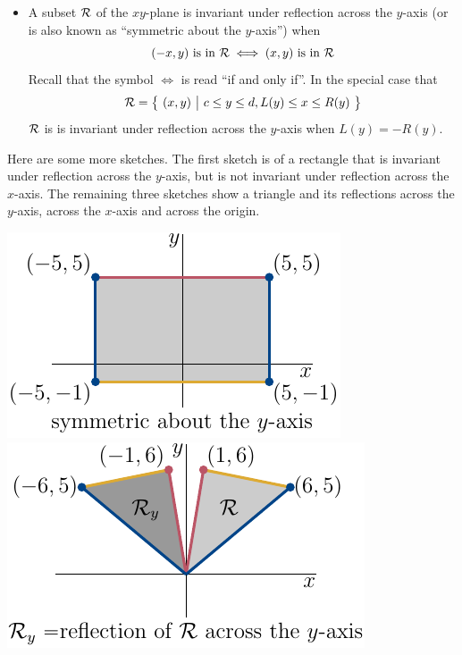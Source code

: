 \begin{itemize}
\item A subset $\mathcal{R}$ of the $xy$-plane is invariant under reflection across the $y$-axis (or is also known as ``symmetric about the $y$-axis'') when
\begin{equation*}
(-x,y)\text{ is in }\mathcal{R}
\iff
(x,y)\text{ is in }\mathcal{R}
\end{equation*}   
Recall that the symbol $\iff$ is read ``if and only if''. In the special case
that 
\begin{equation*}
\mathcal{R}=\big\{ \ (x,y)\ \big|\ c\le y\le d, L(y)\le x\le R(y)\ \big\}
\end{equation*}
$\mathcal{R}$ is is invariant under reflection across the $y$-axis when $L(y)=-R(y)$.
\end{itemize} 
Here are some more sketches. The first sketch is of a rectangle that is
invariant under reflection across the $y$-axis, but is not invariant under reflection across the $x$-axis. The remaining three sketches show a triangle 
and its reflections across the $y$-axis, across the $x$-axis and across 
the origin.

\begin{wfig}
\begin{center}
   \includegraphics[scale=1.0]{reflDySym.pdf}\quad
   \includegraphics[scale=1.0]{reflDy.pdf}
\end{center}
\end{wfig}

